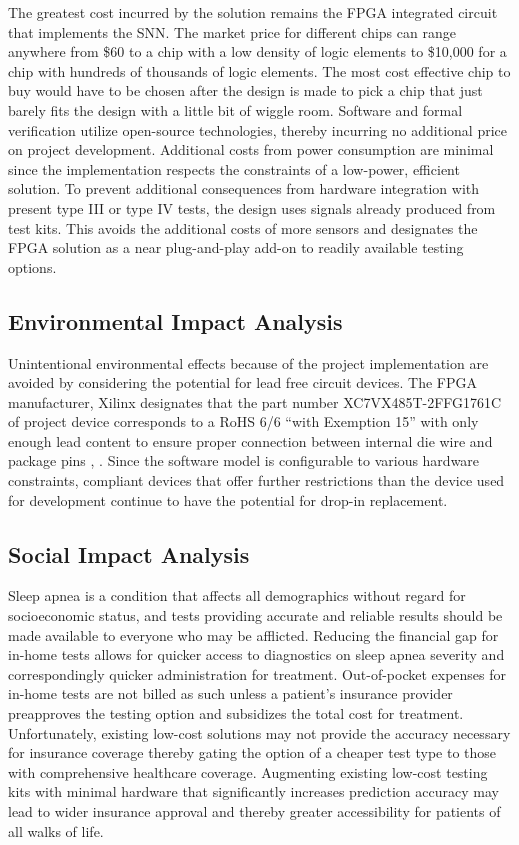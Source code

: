 \documentclass[12pt,titlepage]{article}
\begin{document}
The greatest cost incurred by the solution remains the FPGA integrated circuit that implements the SNN. The market price for different
chips can range anywhere from \$60 to a chip with a low density of logic elements to \$10,000 for a chip with hundreds of thousands of
logic elements. The most cost effective chip to buy would have to be chosen after the design is made to pick a chip that just barely fits
the design with a little bit of wiggle room. Software and formal verification utilize open-source technologies, thereby incurring no
additional price on project development. Additional costs from power consumption are minimal since the implementation respects the
constraints of a low-power, efficient solution. To prevent additional consequences from hardware integration with present type III or
type IV tests, the design uses signals already produced from test kits. This avoids the additional costs of more sensors and designates
the FPGA solution as a near plug-and-play add-on to readily available testing options.

\subsection{Environmental Impact Analysis}
Unintentional environmental effects because of the project implementation are avoided by considering the potential for lead free circuit
devices. The FPGA manufacturer, Xilinx designates that the part number XC7VX485T-2FFG1761C of project device corresponds to a RoHS 6/6
“with Exemption 15” with only enough lead content to ensure proper connection between internal die wire and package pins \cite{xilinx},
\cite{menon}.  Since the software model is configurable to various hardware constraints, compliant devices that offer further restrictions
than the device used for development continue to have the potential for drop-in replacement. 

\subsection{Social Impact Analysis}
Sleep apnea is a condition that affects all demographics without regard for socioeconomic status, and tests providing accurate and reliable
results should be made available to everyone who may be afflicted. Reducing the financial gap for in-home tests allows for quicker access
to diagnostics on sleep apnea severity and correspondingly quicker administration for treatment. Out-of-pocket expenses for in-home tests
are not billed as such unless a patient’s insurance provider preapproves the testing option and subsidizes the total cost for treatment.
Unfortunately, existing low-cost solutions may not provide the accuracy necessary for insurance coverage thereby gating the option of a
cheaper test type to those with comprehensive healthcare coverage. Augmenting existing low-cost testing kits with minimal hardware that
significantly increases prediction accuracy may lead to wider insurance approval and thereby greater accessibility for patients of all
walks of life. 
\end{document}
